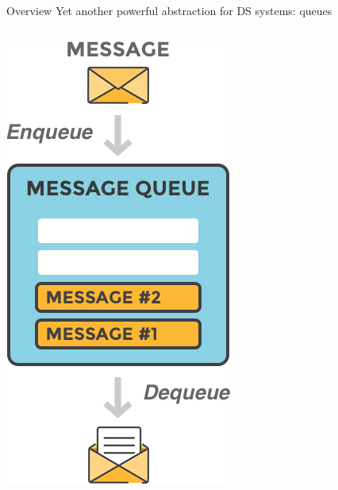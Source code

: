 \documentclass{beamer}\mode<presentation>{\usetheme{AMSBolognaFC}}
\begin{document}
\begin{frame}{Overview}
    Yet another powerful abstraction for DS systems: \alert{queues}
    \begin{columns}
        \begin{column}{.26\linewidth}
            \begin{center}
                \includegraphics[width=\linewidth]{img/queue.png}

\end{center}
\end{column}
\end{columns}
\end{frame}
\end{document}
